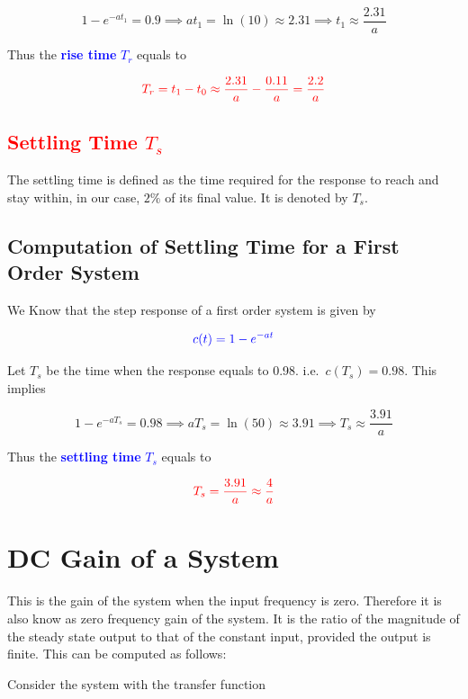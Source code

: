 \documentclass[
  14pt,
  a4paper,
  oneside,
  open=any,
  a4paper,
  14pt]{report}
\begin{document}
\[
    1 - e^{-at_1} = 0.9 \implies at_1 = \ln(10) \approx 2.31 \implies t_1 \approx \dfrac{2.31}{a}
\]

Thus the \textcolor{blue}{\textbf{rise time} \(T_r\)} equals to

\[
    \textcolor{red}{T_r = t_1 - t_0 \approx \dfrac{2.31}{a}-\dfrac{0.11}{a} = \dfrac{2.2}{a}}
\]

\subsection{\texorpdfstring{\textcolor{red}{Settling Time
\(T_s\)}}{Settling Time T\_s}}\label{settling-time-t_s}

The settling time is defined as the time required for the response to
reach and stay within, in our case, \(2\%\) of its final value. It is
denoted by \(T_s\).

\subsection{Computation of Settling Time for a First Order
System}\label{computation-of-settling-time-for-a-first-order-system}

We Know that the step response of a first order system is given by

\[
    \textcolor{blue}{c(t) = 1 - e^{-at}}
\]

Let \(T_s\) be the time when the response equals to 0.98.
i.e.~\(c(T_s) = 0.98\). This implies

\[
    1 - e^{-aT_s} = 0.98 \implies aT_s = \ln(50) \approx 3.91 \implies T_s \approx \dfrac{3.91}{a}
\]

Thus the \textcolor{blue}{\textbf{settling time} \(T_s\)} equals to

\[
    \textcolor{red}{T_s = \dfrac{3.91}{a} \approx \dfrac{4}{a}}
\]

\section{DC Gain of a System}\label{dc-gain-of-a-system}

This is the gain of the system when the input frequency is zero.
Therefore it is also know as zero frequency gain of the system. It is
the ratio of the magnitude of the steady state output to that of the
constant input, provided the output is finite. This can be computed as
follows:

Consider the system with the transfer function
\end{document}
